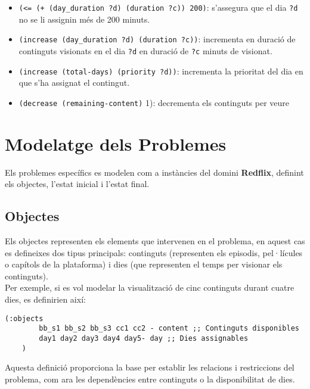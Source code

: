 \documentclass[a4paper]{article}
\begin{document}
	\begin{itemize}[label={}, leftmargin=1.5em, itemsep=0pt]
		\item \texttt{(<= (+ (day\_duration ?d) (duration ?c)) 200)}: s'assegura que el dia \texttt{?d} no se li assignin més de 200 minuts. \\
		
		\item \texttt{(increase (day\_duration ?d) (duration ?c))}: incrementa en duració de continguts visionats en el dia \texttt{?d} en duració de \texttt{?c} minuts de visionat.
		
		\item \texttt{(increase (total-days) (priority ?d))}: incrementa la prioritat del dia en que s'ha assignat el contingut.
		
		\item \texttt{(decrease (remaining-content)} 1): decrementa els continguts per veure
	\end{itemize}
	
	\newpage
	\section{Modelatge dels Problemes}
	
	Els problemes específics es modelen com a instàncies del domini \textbf{Redflix}, definint els objectes, l'estat inicial i l'estat final.
	
	\subsection{Objectes}
	
	Els objectes representen els elements que intervenen en el problema, en aquest cas es defineixes dos tipus principals: continguts (representen els episodis, pel·lícules o capítols de la plataforma) i dies (que representen el temps per visionar els continguts). \\
	
	Per exemple, si es vol modelar la visualització de cinc continguts durant cuatre dies, es definirien així:
	
	\begin{lstlisting}[language=PDDL, caption={Definició d'objectes}, label={lst:def_objectes}]
	(:objects
		bb_s1 bb_s2 bb_s3 cc1 cc2 - content ;; Continguts disponibles
		day1 day2 day3 day4 day5- day ;; Dies assignables
	)
	\end{lstlisting}
	
	Aquesta definició proporciona la base per establir les relacions i restriccions del problema, com ara les dependències entre continguts o la disponibilitat de dies.
	
\end{document}
